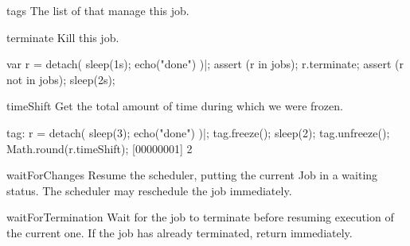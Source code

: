 \begin{urbiscriptapi}
\item[tags] The list of  that manage this job.

\item[terminate]  Kill this job.
\begin{urbiscript}
var r = detach({ sleep(1s); echo("done") })|;
assert (r in jobs);
r.terminate;
assert (r not in jobs);
sleep(2s);
\end{urbiscript}

\item[timeShift]
  Get the total amount of time during which we were frozen.
\begin{urbiscript}
tag: r = detach({ sleep(3); echo("done") })|;
tag.freeze();
sleep(2);
tag.unfreeze();
Math.round(r.timeShift);
[00000001] 2
\end{urbiscript}

\item[waitForChanges] Resume the scheduler, putting the current Job in a
  waiting status.  The scheduler may reschedule the job immediately.

\item[waitForTermination] Wait for the job to terminate before resuming
  execution of the current one.  If the job has already terminated, return
  immediately.
\end{urbiscriptapi}


